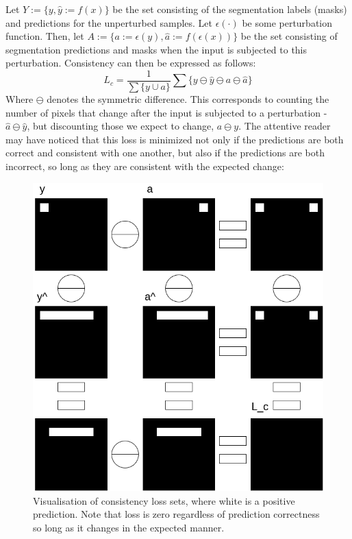	Let \(Y:=\{y,\hat{y}:=f(x)\}\) be the set consisting of the segmentation labels (masks) and predictions for the unperturbed samples. Let \(\epsilon(\cdot)\) be some perturbation function. Then, let \(A:=\{a:=\epsilon(y),\hat{a}:=f(\epsilon(x))\}\) be the set consisting of segmentation predictions and masks when the input is subjected to this perturbation. Consistency can then be expressed as follows: 
	\begin{equation}
		L_c = \frac{1}{\sum\{y \cup a \}} \sum \{y\ominus\hat{y}\ominus a\ominus\hat{a}\}
	\end{equation}
	Where \(\ominus \) denotes the symmetric difference. 
	This corresponds to counting the number of pixels that change after the input is subjected to a perturbation - \(\hat{a}\ominus \hat{y}\), but discounting those we expect to change, \(a\ominus y\). 
	The attentive reader may have noticed that this loss is minimized not only if the predictions are both correct and consistent with one another, but also if the predictions are both incorrect, so long as they are consistent with the expected change:
   
    \begin{figure}[H]
        \includegraphics[width=\linewidth]{illustrations/loss_vis.drawio.png}
        \caption{Visualisation of consistency loss sets, where white is a positive prediction. Note that loss is zero regardless of prediction correctness so long as it changes in the expected manner. }
        \label{loss_fn}
    \end{figure}    
    
